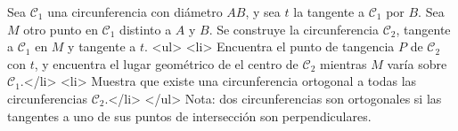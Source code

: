 Sea $\mathcal C_1$ una circunferencia con diámetro $AB$, y sea $t$ la tangente a $\mathcal C_1$ por $B$. Sea $M$ otro punto en $\mathcal C_1$ distinto a $A$ y $B$. Se construye la circunferencia $\mathcal C_2$, tangente a $\mathcal C_1$ en $M$ y tangente a $t$. 
<ul>
<li> Encuentra el punto de tangencia $P$ de $\mathcal C_2$ con $t$, y encuentra el lugar geométrico de el centro de $\mathcal C_2$ mientras $M$ varía sobre $\mathcal C_1$.</li>
<li> Muestra que existe una circunferencia ortogonal a todas las circunferencias $\mathcal C_2$.</li>
</ul> 
Nota: dos circunferencias son ortogonales si las tangentes a uno de sus puntos de intersección son perpendiculares.
